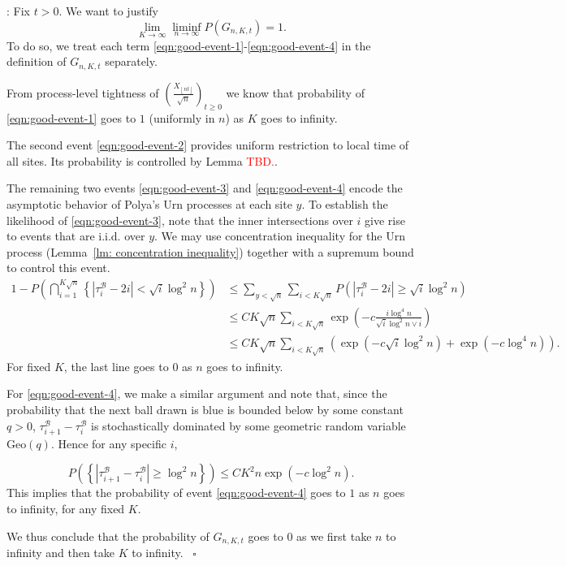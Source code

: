 \documentclass[twoside,12pt,a4paper]{article}
\numberwithin{equation}{section}
\newenvironment{proof}[1][Proof]{{\sc #1}:}{~\hfill $\square$}
\newcommand\TBD{\textcolor{red}{TBD.}}
\begin{document}
\begin{proof}[Proof of Lemma~\ref{lem:good-event}]
	Fix $t>0$. We want to justify
	\[
		\lim_{K\to \infty } \liminf _{n \to \infty } P \left( G_{n, K, t}\right) = 1
	.\] 
	To do so, we treat each term \eqref{eqn:good-event-1}-\eqref{eqn:good-event-4} in the definition of $G_{n, K, t}$ separately.

	From process-level tightness of $\left( \frac{X_{\left\lfloor nt  \right\rfloor}}{\sqrt{n} } \right)_{t \ge 0} $ we know that probability of \eqref{eqn:good-event-1} goes to $1$ (uniformly in $n$) as $K $ goes to infinity. 

	The second event \eqref{eqn:good-event-2} provides uniform restriction to local time of all sites. Its probability is controlled by Lemma \TBD.

	The remaining two events \eqref{eqn:good-event-3} and \eqref{eqn:good-event-4} encode the asymptotic behavior of Polya's Urn processes at each site $y$. To establish the likelihood of \eqref{eqn:good-event-3}, note that the inner intersections over $i$ give rise to events that are i.i.d. over $y$. We may use concentration inequality for the Urn process (Lemma~\ref{lm: concentration inequality}) together with a supremum bound to control this event.
\begin{align*}
	1-P\left(\bigcap_{i = 1}^{K \sqrt{n} } \left\{\left| \tau_i^{\mathcal{B}} - 2 i \right| < \sqrt{ i } \log^2 n \right\}
\right) 
	&\le \sum_{y < \sqrt{n} }\sum_{i < K \sqrt{ n} } P\left( |\tau_i^{\mathcal{B}} - 2i| \ge \sqrt{i} \log^2 n \right) \\
	&\le CK \sqrt{n} \sum_{i < K \sqrt{ n} } \exp\left( - c \frac{i \log^4 n}{\sqrt{i}  \log^2 n \vee i} \right)  \\
	&\le CK \sqrt{n}  \sum_{i < K \sqrt{ n} }  
	\left( \exp\left( - c \sqrt{i}  \log^2 n \right)  + 
	\exp\left( - c \log^4 n \right) \right)
.\end{align*}
For fixed $K$, the last line goes to $0$ as $n$ goes to infinity. 

For \eqref{eqn:good-event-4}, we make a similar argument and note that, since the probability that the next ball drawn is blue is bounded below by some constant $q > 0$, $\tau_{i+1}^{\mathcal{B}} - \tau_{i}^{\mathcal{B}}$ is stochastically dominated by some geometric random variable $\text{Geo}(q)$. Hence for any specific $i$,

\[
	P\left(\left\{\left| \tau_{i+1}^{\mathcal{B}} - \tau_i^{\mathcal{B}} \right| \ge  \log^2 n \right\}\right) 
	\le C K^2 n \exp\left( - c \log^2 n \right) 
.\] 
This implies that the probability of event \eqref{eqn:good-event-4} goes to $1$ as $n$ goes to infinity, for any fixed $K$.

	We thus conclude that the probability of $G_{n, K, t}$ goes to $0$ as we first take $n$ to infinity and then take $K$ to infinity.
\end{proof}
\end{document}
